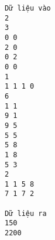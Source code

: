 \begin{verbatim}
Dữ liệu vào
2
3
0 0
2 0
0 2
0 0
1
1 1 1 0
6
1 1
9 1
9 5
5 5
5 8
1 8
5 3
2
1 1 5 8
7 1 7 2	

Dữ liệu ra
150
2200
\end{verbatim}